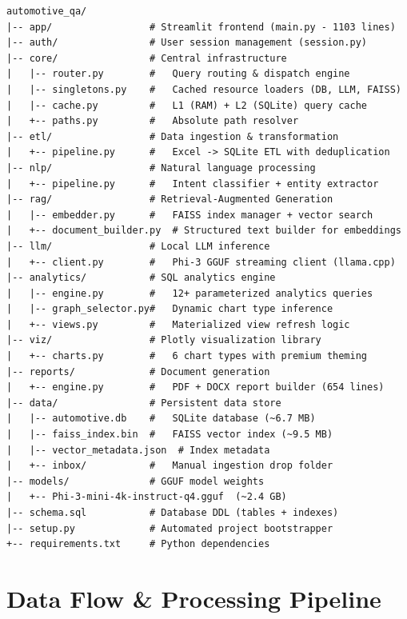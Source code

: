 \documentclass[12pt, a4paper, twoside]{article}
\begin{document}
\begin{lstlisting}[language={}, caption={Project Directory Layout}, label={lst:dirs}]
automotive_qa/
|-- app/                 # Streamlit frontend (main.py - 1103 lines)
|-- auth/                # User session management (session.py)
|-- core/                # Central infrastructure
|   |-- router.py        #   Query routing & dispatch engine
|   |-- singletons.py    #   Cached resource loaders (DB, LLM, FAISS)
|   |-- cache.py         #   L1 (RAM) + L2 (SQLite) query cache
|   +-- paths.py         #   Absolute path resolver
|-- etl/                 # Data ingestion & transformation
|   +-- pipeline.py      #   Excel -> SQLite ETL with deduplication
|-- nlp/                 # Natural language processing
|   +-- pipeline.py      #   Intent classifier + entity extractor
|-- rag/                 # Retrieval-Augmented Generation
|   |-- embedder.py      #   FAISS index manager + vector search
|   +-- document_builder.py  # Structured text builder for embeddings
|-- llm/                 # Local LLM inference
|   +-- client.py        #   Phi-3 GGUF streaming client (llama.cpp)
|-- analytics/           # SQL analytics engine
|   |-- engine.py        #   12+ parameterized analytics queries
|   |-- graph_selector.py#   Dynamic chart type inference
|   +-- views.py         #   Materialized view refresh logic
|-- viz/                 # Plotly visualization library
|   +-- charts.py        #   6 chart types with premium theming
|-- reports/             # Document generation
|   +-- engine.py        #   PDF + DOCX report builder (654 lines)
|-- data/                # Persistent data store
|   |-- automotive.db    #   SQLite database (~6.7 MB)
|   |-- faiss_index.bin  #   FAISS vector index (~9.5 MB)
|   |-- vector_metadata.json  # Index metadata
|   +-- inbox/           #   Manual ingestion drop folder
|-- models/              # GGUF model weights
|   +-- Phi-3-mini-4k-instruct-q4.gguf  (~2.4 GB)
|-- schema.sql           # Database DDL (tables + indexes)
|-- setup.py             # Automated project bootstrapper
+-- requirements.txt     # Python dependencies
\end{lstlisting}

\newpage

\section{Data Flow \& Processing Pipeline}
\end{document}
